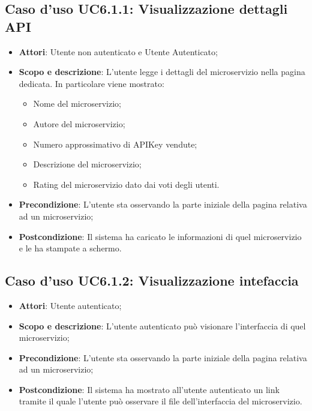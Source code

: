 \documentclass[12pt,a4paper,titlepage]{article}
\begin{document}
	\subsection{Caso d'uso UC6.1.1: Visualizzazione dettagli API}
	\label{UC6.1.1}
	\begin{itemize}
		\item \textbf{Attori}: Utente non autenticato e Utente Autenticato;
		\item \textbf{Scopo e descrizione}: L'utente legge i dettagli del microservizio nella pagina dedicata. In particolare viene mostrato:
		\begin{itemize}
			\item Nome del microservizio;
			\item Autore del microservizio;
			\item Numero approssimativo di APIKey vendute;
			\item Descrizione del microservizio;
			\item Rating del microservizio dato dai voti degli utenti.
		\end{itemize}
		\item \textbf{Precondizione}: L'utente sta osservando la parte iniziale della pagina relativa ad un microservizio;
		\item \textbf{Postcondizione}: Il sistema ha caricato le informazioni di quel microservizio e le ha stampate a schermo.
	\end{itemize}
	\subsection{Caso d'uso UC6.1.2: Visualizzazione intefaccia}
	\label{UC6.1.2}
	\begin{itemize}
		\item \textbf{Attori}: Utente autenticato;
		\item \textbf{Scopo e descrizione}: L'utente autenticato può visionare l'interfaccia di quel microservizio;
		\item \textbf{Precondizione}: L'utente sta osservando la parte iniziale della pagina relativa ad un microservizio;
		\item \textbf{Postcondizione}: Il sistema ha mostrato all'utente autenticato un link tramite il quale l'utente può osservare il file dell'interfaccia del microservizio.
	\end{itemize}
\end{document}
